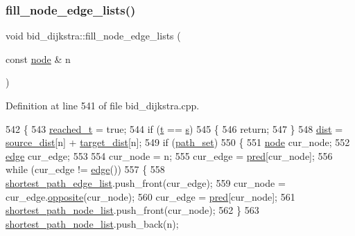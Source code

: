 \subsubsection{\texorpdfstring{fill\+\_\+node\+\_\+edge\+\_\+lists()}{fill\_node\_edge\_lists()}}
{\footnotesize\ttfamily void bid\+\_\+dijkstra\+::fill\+\_\+node\+\_\+edge\+\_\+lists (\begin{DoxyParamCaption}\item[{const \mbox{\hyperlink{classnode}{node}} \&}]{n }\end{DoxyParamCaption})\hspace{0.3cm}{\ttfamily [private]}}



Definition at line 541 of file bid\+\_\+dijkstra.\+cpp.


\begin{DoxyCode}
542 \{
543     \mbox{\hyperlink{classbid__dijkstra_a4714ec557ae9199e88e0242f9c6c2393}{reached\_t}} = \textcolor{keyword}{true};
544     \textcolor{keywordflow}{if} (\mbox{\hyperlink{classbid__dijkstra_a9370a71076d7807d1f3963e6dad9897e}{t}} == \mbox{\hyperlink{classbid__dijkstra_a118e2ebd0d08ffc991c2bc578f8284a4}{s}})
545     \{
546     \textcolor{keywordflow}{return};
547     \}
548     \mbox{\hyperlink{classbid__dijkstra_a10224bf2b56cb3fe20cef83592ecdc13}{dist}} = \mbox{\hyperlink{classbid__dijkstra_a19dc6c350617f0fa5769e5c70781d658}{source\_dist}}[n] + \mbox{\hyperlink{classbid__dijkstra_a7a46fe8fe075d798eaca14b37aa15c0d}{target\_dist}}[n];
549     \textcolor{keywordflow}{if} (\mbox{\hyperlink{classbid__dijkstra_aa7b329f69600fffae2753f87501dab9d}{path\_set}})
550     \{
551     \mbox{\hyperlink{classnode}{node}} cur\_node;
552     \mbox{\hyperlink{classedge}{edge}} cur\_edge;
553 
554     cur\_node = n;
555     cur\_edge = \mbox{\hyperlink{classbid__dijkstra_a930f24f8d17953eccfa0e8765587b0ea}{pred}}[cur\_node];
556     \textcolor{keywordflow}{while} (cur\_edge != \mbox{\hyperlink{classedge}{edge}}())
557     \{
558         \mbox{\hyperlink{classbid__dijkstra_a4b7bdbc4d016748b40ca925cf1e6f778}{shortest\_path\_edge\_list}}.push\_front(cur\_edge);
559         cur\_node = cur\_edge.\mbox{\hyperlink{classedge_ab64dc3659c9003337b0c3749a8b879cf}{opposite}}(cur\_node);
560         cur\_edge = \mbox{\hyperlink{classbid__dijkstra_a930f24f8d17953eccfa0e8765587b0ea}{pred}}[cur\_node];
561         \mbox{\hyperlink{classbid__dijkstra_a70041b0a90fb840e141126fe7a6119db}{shortest\_path\_node\_list}}.push\_front(cur\_node);
562     \}
563     \mbox{\hyperlink{classbid__dijkstra_a70041b0a90fb840e141126fe7a6119db}{shortest\_path\_node\_list}}.push\_back(n);

\end{DoxyCode}
